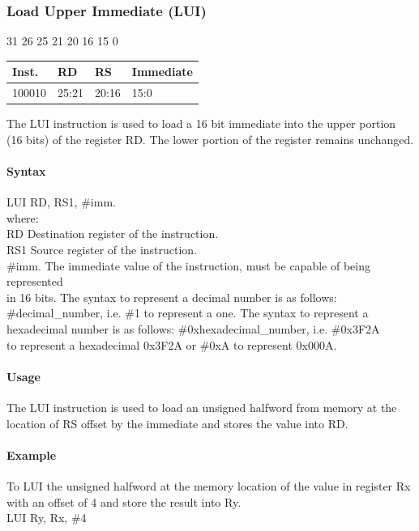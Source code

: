 \documentclass[12pt]{article}
\newcommand{\iTypeInstruction}[6]
{%
    \hspace{1.6cm}31 \hspace{1.15cm}26 \hspace{.05cm}25 \hspace{.8cm}21 \hspace{.05cm}20 \hspace{.8cm}16 \hspace{.05cm}15 \hspace{6.4cm}0
    \vspace{-.25cm}
    \begin{center}
        \begin{tabular}{ |p{1.8cm}|p{1.5cm}|p{1.5cm}|p{6.8cm}| }
            \hline
            \textbf{Inst.} & \textbf{RD} &  \textbf{RS} & \textbf{Immediate}\\
            \hline
            #1 & 25:21 & 20:16 &15:0\\
            \hline
        \end{tabular}
    \end{center}
    
    \noindent
    #2
    
    \paragraph{Syntax}
    \begin{flushleft}
    #3 RD, RS1, \#imm.\\
    \vspace{1em}        %
    where:\\
    \vspace{1em}
    RD  \hspace{3.6em} Destination register of the instruction.\\
    \vspace{1em}
    RS1  \hspace{3.35em} Source register of the instruction.\\
    \vspace{1em}
    \#imm.  \hspace{1.8em} The immediate value of the instruction, must be capable of being represented\\             \hspace{5.4em} in 16 bits. The syntax to represent a decimal number is as follows:\\
            \hspace{5.4em} \#decimal\_number, i.e. \#1 to represent a one. The syntax to represent a\\
            \hspace{5.4em} hexadecimal number is as follows: \#0xhexadecimal\_number, i.e. \#0x3F2A \\
            \hspace{5.4em} to represent a hexadecimal 0x3F2A or \#0xA to represent 0x000A.\\
    \end{flushleft}
    
    \paragraph{Usage}
    \begin{flushleft}
    #4\\
    \end{flushleft}
    \paragraph{Example}
    \begin{flushleft}
    #5\\
    \vspace{1em}
    #6
    \end{flushleft}}
\begin{document}

    \newpage
    \subsubsection{Load Upper Immediate (LUI)}
    
    \iTypeInstruction
    {100010}
    {The LUI instruction is used to load a 16 bit immediate into the upper portion (16 bits) of the register RD. The lower portion of the register remains unchanged.}
    {LUI}
    {The LUI instruction is used to load an unsigned halfword from memory at the location of RS offset by the immediate and stores the value into RD.}
    {To LUI the unsigned halfword at the memory location of the value in register Rx with an offset of 4 and store the result into Ry.}
    {LUI Ry, Rx, \#4}
    
    
    
\end{document}
